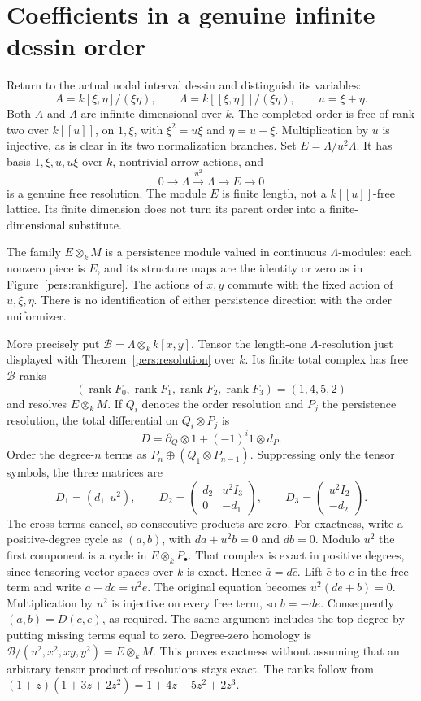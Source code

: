 \section{Coefficients in a genuine infinite dessin order}
Return to the actual nodal interval dessin and distinguish its variables:
\[
 A=k[\xi,\eta]/(\xi\eta),\qquad
 \Lambda=k[[\xi,\eta]]/(\xi\eta),\qquad u=\xi+\eta.
\]
Both $A$ and $\Lambda$ are infinite dimensional over $k$.
The completed order is free of rank two over $k[[u]]$, on $1,\xi$,
with $\xi^2=u\xi$ and $\eta=u-\xi$. Multiplication by $u$ is injective,
as is clear in its two normalization branches. Set $E=\Lambda/u^2\Lambda$.
It has basis $1,\xi,u,u\xi$ over $k$, nontrivial arrow actions, and
\[
 0\longrightarrow\Lambda\xrightarrow{u^2}\Lambda\longrightarrow E
       \longrightarrow0
\]
is a genuine free resolution. The module $E$ is finite length, not a
$k[[u]]$-free lattice. Its finite dimension does not turn its parent order
into a finite-dimensional substitute.

The family $E\otimes_k M$ is a persistence module valued in continuous
$\Lambda$-modules: each nonzero piece is $E$, and its structure maps are
the identity or zero as in Figure~\ref{pers:rankfigure}. The actions of
$x,y$ commute with the fixed action of $u,\xi,\eta$. There is no
identification of either persistence direction with the order uniformizer.

More precisely put $\mathcal B=\Lambda\otimes_k k[x,y]$. Tensor the
length-one $\Lambda$-resolution just displayed with
Theorem~\ref{pers:resolution} over $k$. Its finite total complex has
free $\mathcal B$-ranks
\[
 (\operatorname{rank}F_0,\operatorname{rank}F_1,
   \operatorname{rank}F_2,\operatorname{rank}F_3)=(1,4,5,2)
\]
and resolves $E\otimes_k M$. If $Q_i$ denotes the order resolution and
$P_j$ the persistence resolution, the total differential on $Q_i\otimes P_j$
is
\[
 D=\partial_Q\otimes1+(-1)^i1\otimes d_P.
\]
Order the degree-$n$ terms as $P_n\oplus(Q_1\otimes P_{n-1})$.
Suppressing only the tensor symbols, the three matrices are
\[
 D_1=(d_1\ \ u^2),\qquad
 D_2=\begin{pmatrix}d_2&u^2I_3\\0&-d_1\end{pmatrix},\qquad
 D_3=\begin{pmatrix}u^2I_2\\-d_2\end{pmatrix}.
\]
The cross terms cancel, so consecutive products are zero. For exactness,
write a positive-degree cycle as $(a,b)$, with
$d a+u^2b=0$ and $d b=0$. Modulo $u^2$ the first component is a cycle
in $E\otimes_k P_\bullet$. That complex is exact in positive degrees,
since tensoring vector spaces over $k$ is exact. Hence
$\bar a=d\bar c$. Lift $\bar c$ to $c$ in the free term and write
$a-dc=u^2e$. The original equation becomes $u^2(de+b)=0$.
Multiplication by $u^2$ is injective on every free term, so $b=-de$.
Consequently $(a,b)=D(c,e)$, as required. The same argument includes
the top degree by putting missing terms equal to zero. Degree-zero
homology is $\mathcal B/(u^2,x^2,xy,y^2)=E\otimes_k M$.
This proves exactness without assuming that an arbitrary tensor product
of resolutions stays exact. The ranks follow from
$(1+z)(1+3z+2z^2)=1+4z+5z^2+2z^3$.

